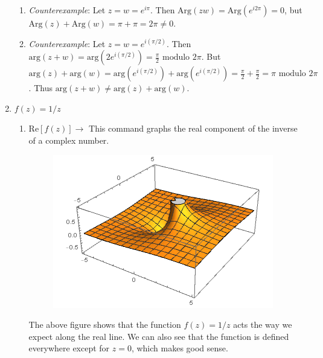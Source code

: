 \documentclass{article}
\begin{document}
\begin{enumerate}
\begin{enumerate}
		\item \textit{Counterexample}: Let $z=w=e^{i\pi}$. Then $\text{Arg}(zw)=\text{Arg}(e^{i2\pi})=0$, but $\text{Arg}(z)+\text{Arg}(w)=\pi+\pi=2\pi\neq0$. 
		
		\item \textit{Counterexample}: Let $z=w=e^{i(\pi/2)}$. Then $\text{arg}(z+w)=\text{arg}(2e^{i(\pi/2)})=\frac{\pi}{2} \text{ modulo } 2\pi$. But $\text{arg}(z)+\text{arg}(w)=\text{arg}(e^{i(\pi/2)})+\text{arg}(e^{i(\pi/2)})=\frac{\pi}{2} + \frac{\pi}{2}= \pi \text{ modulo } 2\pi$. Thus $\text{arg}(z+w)\neq\text{arg}(z)+\text{arg}(w)$.
		
				
	\end{enumerate}
	
	\item $f(z)=1/z$
	\begin{enumerate}
		\item Re$\left[f(z)\right] \rightarrow$ 
		This command graphs the real component of the inverse of a complex number.
			\begin{figure}[H]
			\includegraphics[scale=0.8]{image1.png}
			\end{figure}
		The above figure shows that the function $f(z)=1/z$ acts the way we expect along the real line. We can also see that the function is defined everywhere except for $z=0$, which makes good sense.
		

\end{enumerate}
\end{enumerate}
\end{document}
